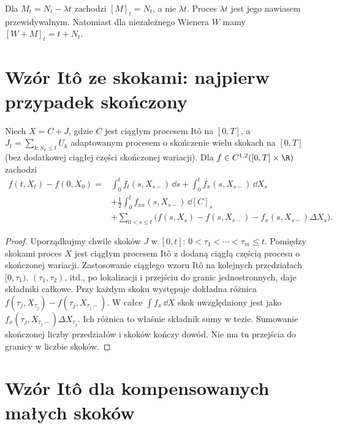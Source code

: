 \begin{przyklad}
Dla $M_t=N_t-\lambda t$ zachodzi $[M]_t=N_t$,
a nie $\lambda t$. Proces $\lambda t$ jest jego nawiasem
przewidywalnym. Natomiast dla niezależnego Wienera
$W$ mamy $[W+M]_t=t+N_t$.
\end{przyklad}

\section{Wzór Itô ze skokami: najpierw przypadek skończony}

\begin{lemat}
\label{lem:finite-jump-ito}
Niech $X=C+J$, gdzie $C$ jest ciągłym procesem Itô
na $[0,T]$, a $J_t=\sum_{k:S_k\le t}U_k$ adaptowanym procesem
o skończenie wielu skokach na $[0,T]$ (bez dodatkowej
ciągłej części skończonej wariacji).
Dla $f\in C^{1,2}([0,T]\times\R)$ zachodzi
\[
\begin{split}
f(t,X_t)-f(0,X_0)={}&\int_0^t f_t(s,X_{s-})\,\dd s
+\int_0^t f_x(s,X_{s-})\,\dd X_s\\
&+\frac12\int_0^t f_{xx}(s,X_{s-})\,\dd[C]_s\\
&+\sum_{0<s\le t}\bigl(f(s,X_s)-f(s,X_{s-})
-f_x(s,X_{s-})\Delta X_s\bigr).
\end{split}
\tag{12.3}\label{eq:ito-finite-jumps}
\]
\end{lemat}
\begin{proof}
Uporządkujmy chwile skoków $J$ w $[0,t]$:
$0<\tau_1<\cdots<\tau_m\le t$. Pomiędzy skokami
proces $X$ jest ciągłym procesem Itô z dodaną
ciągłą częścią procesu o skończonej wariacji.
Zastosowanie ciągłego wzoru Itô na kolejnych przedziałach
$[0,\tau_1)$, $(\tau_1,\tau_2)$, itd., po lokalizacji i
przejściu do granic jednostronnych, daje składniki
całkowe. Przy każdym skoku występuje dokładna różnica
$f(\tau_j,X_{\tau_j})-f(\tau_j,X_{\tau_j-})$.
W całce $\int f_x\,\dd X$ skok uwzględniony jest jako
$f_x(\tau_j,X_{\tau_j-})\Delta X_{\tau_j}$.
Ich różnica to właśnie składnik sumy w tezie.
Sumowanie skończonej liczby przedziałów i skoków
kończy dowód. Nie ma tu przejścia do granicy w liczbie skoków.
\end{proof}

\section{Wzór Itô dla kompensowanych małych skoków}


